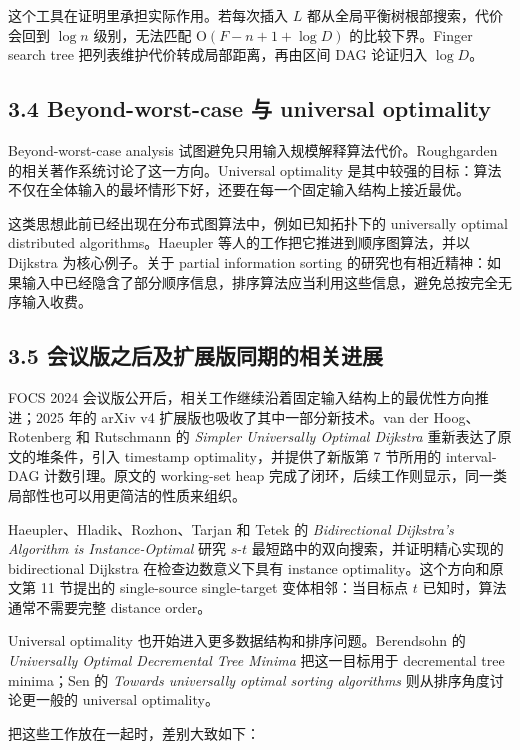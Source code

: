 这个工具在证明里承担实际作用。若每次插入 \(L\) 都从全局平衡树根部搜索，代价会回到 \(\log n\) 级别，无法匹配 \(\mathrm{O}(F-n+1+\log D)\) 的比较下界。Finger search tree 把列表维护代价转成局部距离，再由区间 DAG 论证归入 \(\log D\)。

\subsection*{3.4 Beyond-worst-case 与 universal optimality}
Beyond-worst-case analysis 试图避免只用输入规模解释算法代价。Roughgarden 的相关著作系统讨论了这一方向。Universal optimality 是其中较强的目标：算法不仅在全体输入的最坏情形下好，还要在每一个固定输入结构上接近最优。

这类思想此前已经出现在分布式图算法中，例如已知拓扑下的 universally optimal distributed algorithms。Haeupler 等人的工作把它推进到顺序图算法，并以 Dijkstra 为核心例子。关于 partial information sorting 的研究也有相近精神：如果输入中已经隐含了部分顺序信息，排序算法应当利用这些信息，避免总按完全无序输入收费。

\subsection*{3.5 会议版之后及扩展版同期的相关进展}
FOCS 2024 会议版公开后，相关工作继续沿着固定输入结构上的最优性方向推进；2025 年的 arXiv v4 扩展版也吸收了其中一部分新技术。van der Hoog、Rotenberg 和 Rutschmann 的 \emph{Simpler Universally Optimal Dijkstra} 重新表达了原文的堆条件，引入 timestamp optimality，并提供了新版第 7 节所用的 interval-DAG 计数引理。原文的 working-set heap 完成了闭环，后续工作则显示，同一类局部性也可以用更简洁的性质来组织。

Haeupler、Hladik、Rozhon、Tarjan 和 Tetek 的 \emph{Bidirectional Dijkstra's Algorithm is Instance-Optimal} 研究 \(s\text{-}t\) 最短路中的双向搜索，并证明精心实现的 bidirectional Dijkstra 在检查边数意义下具有 instance optimality。这个方向和原文第 11 节提出的 single-source single-target 变体相邻：当目标点 \(t\) 已知时，算法通常不需要完整 distance order。

Universal optimality 也开始进入更多数据结构和排序问题。Berendsohn 的 \emph{Universally Optimal Decremental Tree Minima} 把这一目标用于 decremental tree minima；Sen 的 \emph{Towards universally optimal sorting algorithms} 则从排序角度讨论更一般的 universal optimality。

把这些工作放在一起时，差别大致如下：

